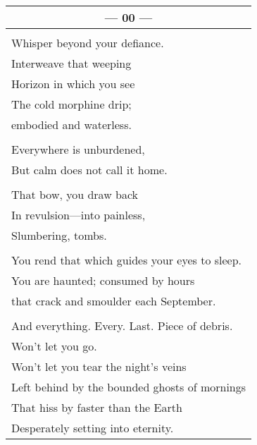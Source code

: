 \documentclass{article}
\begin{document}
\newpage

\begin{center}
\begin{tabular}{l}
\multicolumn{1}{c}{\textbf{--- 00 ---}} \\ \hline
\\
Whisper beyond your defiance. \\
Interweave that weeping \\
Horizon in which you see \\
The cold morphine drip; \\
embodied and waterless. \\
\\
Everywhere is unburdened, \\
But calm does not call it home. \\
\\
That bow, you draw back \\
In revulsion---into painless, \\
Slumbering, tombs. \\ %
\\
You rend that which guides your eyes to sleep. \\
You are haunted; consumed by hours \\
that crack and smoulder each September. \\
\\
And everything. Every. Last. Piece of debris. \\
Won't let you go. \\
Won't let you tear the night's veins \\
Left behind by the bounded ghosts of mornings \\
That hiss by faster than the Earth \\
Desperately setting into eternity. \\
\end{tabular}
\end{center}

\newpage
\end{document}
